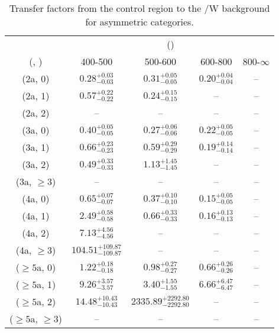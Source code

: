\begin{table}[h!]
\tiny
\centering
\caption{Transfer factors from the \gj control region to the \ttbar/W background for asymmetric categories.\label{tab:tf_gj_ttw_asym}}
\begin{tabular}
{ccccc}
	\hline\hline
	& \multicolumn{4}{c}{\scalht (\gev)} \\ 
	 (\njet,  \nb) & 400-500 & 500-600 & 600-800 & 800-$\infty$ \\ [0.8ex] 
\hline
	(2a, 0) & $0.28^{+ 0.03 }_{- 0.03 }$ & $0.31^{+ 0.05 }_{- 0.05 }$ & $0.20^{+ 0.04 }_{- 0.04 }$ & -- \\[0.5ex] 
	(2a, 1) & $0.57^{+ 0.22 }_{- 0.22 }$ & $0.24^{+ 0.15 }_{- 0.15 }$ & -- & -- \\[0.5ex] 
	(2a, 2) & -- & -- & -- & -- \\[0.5ex] 
	(3a, 0) & $0.40^{+ 0.05 }_{- 0.05 }$ & $0.27^{+ 0.06 }_{- 0.06 }$ & $0.22^{+ 0.05 }_{- 0.05 }$ & -- \\[0.5ex] 
	(3a, 1) & $0.66^{+ 0.23 }_{- 0.23 }$ & $0.59^{+ 0.29 }_{- 0.29 }$ & $0.19^{+ 0.14 }_{- 0.14 }$ & -- \\[0.5ex] 
	(3a, 2) & $0.49^{+ 0.33 }_{- 0.33 }$ & $1.13^{+ 1.45 }_{- 1.45 }$ & -- & -- \\[0.5ex] 
	(3a, $\ge3$) & -- & -- & -- & -- \\[0.5ex] 
	(4a, 0) & $0.65^{+ 0.07 }_{- 0.07 }$ & $0.37^{+ 0.10 }_{- 0.10 }$ & $0.15^{+ 0.05 }_{- 0.05 }$ & -- \\[0.5ex] 
	(4a, 1) & $2.49^{+ 0.58 }_{- 0.58 }$ & $0.66^{+ 0.33 }_{- 0.33 }$ & $0.16^{+ 0.13 }_{- 0.13 }$ & -- \\[0.5ex] 
	(4a, 2) & $7.13^{+ 4.56 }_{- 4.56 }$ & -- & -- & -- \\[0.5ex] 
	(4a, $\ge3$) & $104.51^{+ 109.87 }_{- 109.87 }$ & -- & -- & -- \\[0.5ex] 
	($\ge5$a, 0) & $1.22^{+ 0.18 }_{- 0.18 }$ & $0.98^{+ 0.27 }_{- 0.27 }$ & $0.66^{+ 0.26 }_{- 0.26 }$ & -- \\[0.5ex] 
	($\ge5$a, 1) & $9.26^{+ 3.57 }_{- 3.57 }$ & $3.40^{+ 1.55 }_{- 1.55 }$ & $6.66^{+ 6.47 }_{- 6.47 }$ & -- \\[0.5ex] 
	($\ge5$a, 2) & $14.48^{+ 10.43 }_{- 10.43 }$ & $2335.89^{+ 2292.80 }_{- 2292.80 }$ & -- & -- \\[0.5ex] 
	($\ge5$a, $\ge3$) & -- & -- & -- & -- \\[0.5ex] 
	\hline
	\hline
\end{tabular}
\end{table}
